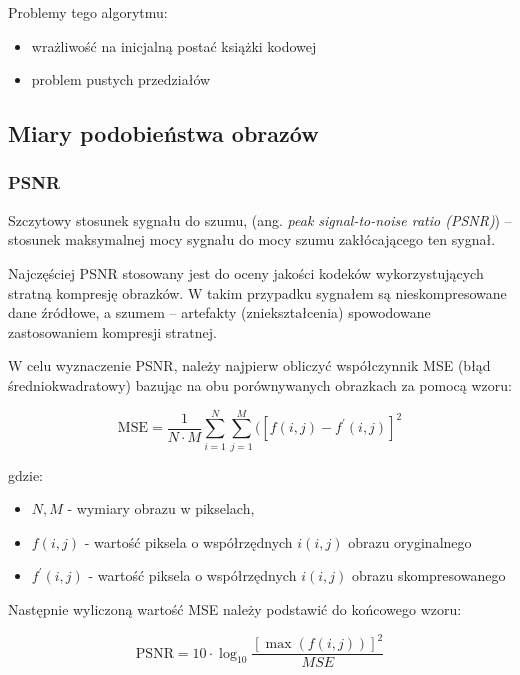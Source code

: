 \documentclass{article}
\begin{document}
Problemy tego algorytmu:

\begin{itemize}
  \item wrażliwość na inicjalną postać książki kodowej
  \item problem pustych przedziałów
\end{itemize}

\subsection{Miary podobieństwa obrazów}

\subsubsection{PSNR}

Szczytowy stosunek sygnału do szumu, (ang. \emph{peak signal-to-noise ratio (PSNR)}) – stosunek maksymalnej mocy sygnału do mocy szumu zakłócającego ten sygnał.  

Najczęściej PSNR stosowany jest do oceny jakości kodeków wykorzystujących stratną kompresję obrazków. 
W takim przypadku sygnałem są nieskompresowane dane źródłowe, a szumem – artefakty (zniekształcenia) spowodowane zastosowaniem kompresji stratnej. 

W celu wyznaczenie PSNR, należy najpierw obliczyć współczynnik MSE (błąd średniokwadratowy) bazując na obu porównywanych obrazkach za pomocą wzoru:

\begin{equation}
    \mathrm{MSE} = \frac{1}{N \cdot M} \sum_{i=1}^N \sum_{j=1}^M ([f(i, j) - f^{'}(i, j)]^2
\end{equation}

gdzie:
\begin{itemize}[label=]
  \item $N, M$ - wymiary obrazu w pikselach,
  \item $f(i, j)$ - wartość piksela o współrzędnych $i(i, j)$ obrazu oryginalnego
  \item $f^{'}(i, j)$ - wartość piksela o współrzędnych $i(i, j)$ obrazu skompresowanego
\end{itemize}

Następnie wyliczoną wartość MSE należy podstawić do końcowego wzoru: 

\begin{equation}
    \mathrm{PSNR} = 10 \cdot \log_{10} \frac{[\max(f(i,j))]^2}{MSE}
\end{equation}
\end{document}
